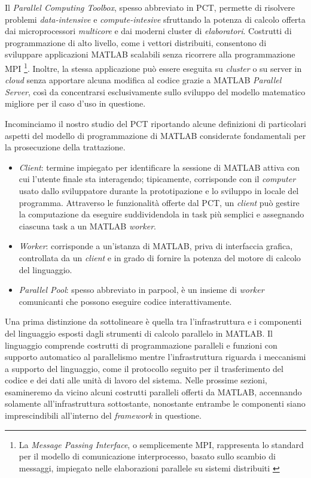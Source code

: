 \nocite{MathWorksParallelComputing}
Il \textit{Parallel Computing Toolbox}, spesso abbreviato in PCT, permette di risolvere problemi \textit{data-intensive} e \textit{compute-intesive} sfruttando 
la potenza di calcolo offerta dai microprocessori \textit{multicore} e dai moderni cluster di \textit{elaboratori}. \newline
Costrutti di programmazione di alto livello, come i vettori distribuiti, consentono di sviluppare applicazioni MATLAB scalabili senza ricorrere alla programmazione MPI \footnote{La \textit{Message 
Passing Interface}, o semplicemente MPI, rappresenta lo standard per il modello di comunicazione interprocesso, basato sullo scambio di messaggi, impiegato nelle elaborazioni 
parallele su sistemi distribuiti \cite{NMSUMPIIntro}}.\newline
Inoltre, la stessa applicazione pu\`o essere eseguita su \textit{cluster} o su server in \textit{cloud} senza apportare alcuna modifica al codice grazie a MATLAB 
\textit{Parallel Server}, cos\`i da concentrarsi esclusivamente sullo sviluppo del modello matematico migliore per il caso d'uso in questione.

Incominciamo il nostro studio del PCT riportando alcune definizioni di particolari aspetti del modello di programmazione di MATLAB considerate fondamentali per la prosecuzione della trattazione.
\begin{itemize}
\item \textit{Client}: termine impiegato per identificare la sessione di MATLAB attiva con cui l'utente finale sta interagendo; tipicamente, corrisponde con il \textit{computer} usato dallo sviluppatore durante la prototipazione e lo sviluppo in locale del programma.\newline
Attraverso le funzionalit\`a offerte dal PCT, un \textit{client} pu\`o gestire la computazione da eseguire suddividendola in  task pi\`u semplici e assegnando ciascuna task a un MATLAB \textit{worker}.
\item \textit{Worker}: corrisponde a un'istanza di MATLAB, priva di interfaccia grafica, controllata da un \textit{client} e in grado di fornire la potenza del motore di calcolo del linguaggio.
\item \textit{Parallel Pool}: spesso abbreviato in parpool, \`e un insieme di \textit{worker} comunicanti che possono eseguire codice interattivamente.
\end{itemize}

Una prima distinzione da sottolineare \`e quella tra l'infrastruttura e i componenti del linguaggio esposti dagli strumenti di calcolo parallelo in MATLAB. 
Il linguaggio comprende costrutti di programmazione paralleli e funzioni con supporto automatico al parallelismo mentre l'infrastruttura riguarda i meccanismi 
a supporto del linguaggio, come il protocollo seguito per il trasferimento del codice e dei dati alle unit\`a di lavoro del sistema. \newline
Nelle prossime sezioni, esamineremo da vicino alcuni costrutti paralleli offerti da MATLAB, accennando solamente all'infrastruttura sottostante, nonostante entrambe le componenti siano imprescindibili all'interno del \textit{framework} in questione.

